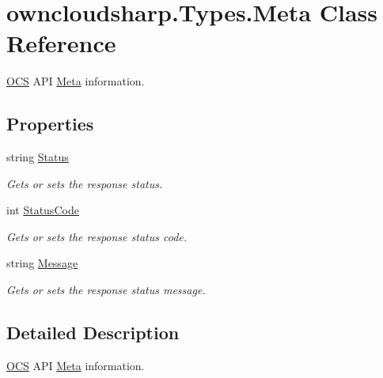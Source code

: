 \hypertarget{classowncloudsharp_1_1_types_1_1_meta}{}\section{owncloudsharp.\+Types.\+Meta Class Reference}
\label{classowncloudsharp_1_1_types_1_1_meta}


\hyperlink{classowncloudsharp_1_1_types_1_1_o_c_s}{O\+CS} A\+PI \hyperlink{classowncloudsharp_1_1_types_1_1_meta}{Meta} information.  


\subsection*{Properties}
\begin{DoxyCompactItemize}
\item 
string \hyperlink{classowncloudsharp_1_1_types_1_1_meta_acdc52e0c7e0df65d17a7247e1527f518}{Status}
\begin{DoxyCompactList}\small\item\em Gets or sets the response status. \end{DoxyCompactList}\item 
int \hyperlink{classowncloudsharp_1_1_types_1_1_meta_a8322438609748cc7c0fca4984daf39c2}{Status\+Code}
\begin{DoxyCompactList}\small\item\em Gets or sets the response status code. \end{DoxyCompactList}\item 
string \hyperlink{classowncloudsharp_1_1_types_1_1_meta_a2dcb4b0826692240c02ee824cd84b62b}{Message}
\begin{DoxyCompactList}\small\item\em Gets or sets the response status message. \end{DoxyCompactList}\end{DoxyCompactItemize}


\subsection{Detailed Description}
\hyperlink{classowncloudsharp_1_1_types_1_1_o_c_s}{O\+CS} A\+PI \hyperlink{classowncloudsharp_1_1_types_1_1_meta}{Meta} information. 



